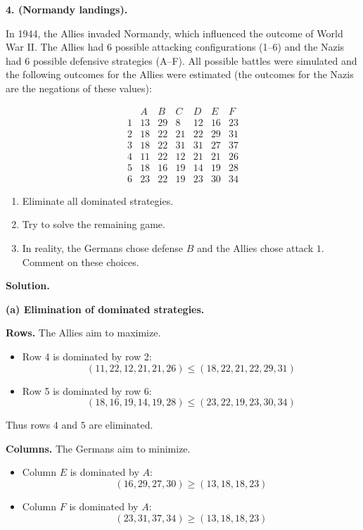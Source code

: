 \textbf{4. (Normandy landings).}

In 1944, the Allies invaded Normandy, which influenced the outcome of World War II.
The Allies had 6 possible attacking configurations (1--6) and the Nazis had 6 possible defensive strategies (A--F).
All possible battles were simulated and the following outcomes for the Allies were estimated
(the outcomes for the Nazis are the negations of these values):

\[
\begin{array}{c|cccccc}
 & A & B & C & D & E & F\\
\hline
1 & 13 & 29 & 8 & 12 & 16 & 23\\
2 & 18 & 22 & 21 & 22 & 29 & 31\\
3 & 18 & 22 & 31 & 31 & 27 & 37\\
4 & 11 & 22 & 12 & 21 & 21 & 26\\
5 & 18 & 16 & 19 & 14 & 19 & 28\\
6 & 23 & 22 & 19 & 23 & 30 & 34
\end{array}
\]

\begin{enumerate}
\item[(a)] Eliminate all dominated strategies.
\item[(b)] Try to solve the remaining game.
\item[(c)] In reality, the Germans chose defense \(B\) and the Allies chose attack \(1\).
Comment on these choices.
\end{enumerate}

\textbf{Solution.}


\textbf{(a) Elimination of dominated strategies.}

\textbf{Rows.}
The Allies aim to maximize.

\begin{itemize}
\item Row 4 is dominated by row 2:
\[
(11,22,12,21,21,26)\le (18,22,21,22,29,31)
\]
\item Row 5 is dominated by row 6:
\[
(18,16,19,14,19,28)\le (23,22,19,23,30,34)
\]
\end{itemize}

Thus rows \(4\) and \(5\) are eliminated.

\textbf{Columns.}
The Germans aim to minimize.

\begin{itemize}
\item Column \(E\) is dominated by \(A\):
\[
(16,29,27,30)\ge (13,18,18,23)
\]
\item Column \(F\) is dominated by \(A\):
\[
(23,31,37,34)\ge (13,18,18,23)
\]
\end{itemize}

